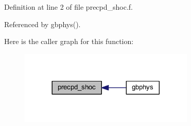 Definition at line 2 of file precpd\+\_\+shoc.\+f.



Referenced by gbphys().



Here is the caller graph for this function\+:
\nopagebreak
\begin{figure}[H]
\begin{center}
\leavevmode
\includegraphics[width=236pt]{precpd__shoc_8f_a9dc8dede4aa2694932f96efe2fb29608_icgraph}
\end{center}
\end{figure}


